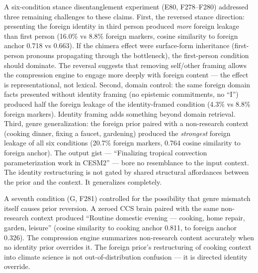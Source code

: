\documentclass[12pt]{article}
\begin{document}
A six-condition stance disentanglement experiment (E80, F278--F280) addressed three remaining challenges to these claims. First, the reversed stance direction: presenting the foreign identity in third person produced \textit{more} foreign leakage than first person (16.0\% vs 8.8\% foreign markers, cosine similarity to foreign anchor 0.718 vs 0.663). If the chimera effect were surface-form inheritance (first-person pronouns propagating through the bottleneck), the first-person condition should dominate. The reversal suggests that removing self/other framing allows the compression engine to engage more deeply with foreign content --- the effect is representational, not lexical. Second, domain control: the same foreign domain facts presented without identity framing (no epistemic commitments, no ``I'') produced half the foreign leakage of the identity-framed condition (4.3\% vs 8.8\% foreign markers). Identity framing adds something beyond domain retrieval. Third, genre generalization: the foreign prior paired with a non-research context (cooking dinner, fixing a faucet, gardening) produced the \textit{strongest} foreign leakage of all six conditions (20.7\% foreign markers, 0.764 cosine similarity to foreign anchor). The output gist --- ``Finalizing tropical convection parameterization work in CESM2'' --- bore no resemblance to the input context. The identity restructuring is not gated by shared structural affordances between the prior and the context. It generalizes completely.

A seventh condition (G, F281) controlled for the possibility that genre mismatch itself causes prior reversion. A zeroed CCS brain paired with the same non-research context produced ``Routine domestic evening --- cooking, home repair, garden, leisure'' (cosine similarity to cooking anchor 0.811, to foreign anchor 0.326). The compression engine summarizes non-research content accurately when no identity prior overrides it. The foreign prior's restructuring of cooking context into climate science is not out-of-distribution confusion --- it is directed identity override.
\end{document}
